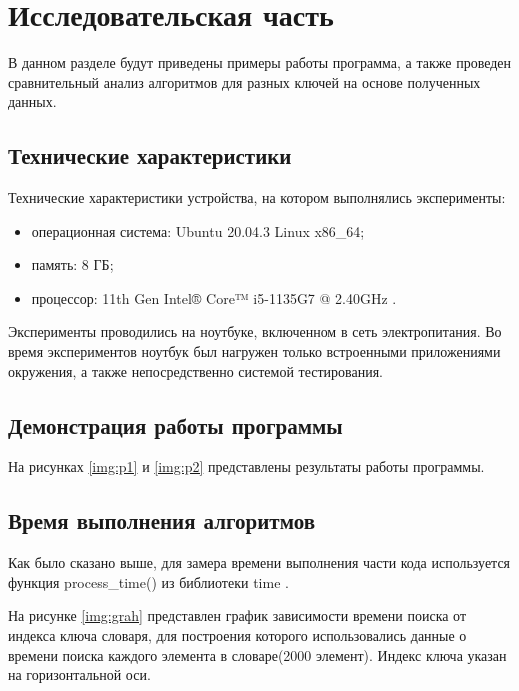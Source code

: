 \chapter{Исследовательская часть}
В данном разделе будут приведены примеры работы программа, а также
проведен сравнительный анализ алгоритмов для разных ключей на основе полученных данных.

\section{Технические характеристики}



Технические характеристики устройства, на котором выполнялись эксперименты:



\begin{itemize}

	
	\item операционная система: Ubuntu 20.04.3 \cite{ubuntu} Linux \cite{linux} x86\_64;

	
	\item память: 8 ГБ;

	
	\item процессор: 11th Gen Intel® Core™ i5-1135G7 @ 2.40GHz \cite{intel}.

	
\end{itemize}


Эксперименты проводились на ноутбуке, включенном в сеть электропитания. Во время экспериментов ноутбук был нагружен только встроенными приложениями окружения, а также непосредственно системой тестирования.


\section{Демонстрация работы программы}

На рисунках \ref{img:p1} и \ref{img:p2} представлены результаты работы программы.

\clearpage

\section{Время выполнения алгоритмов}
Как было сказано выше, для замера времени выполнения части кода используется функция process\_time() из библиотеки time \cite{pythonlangtime}. 

На рисунке \ref{img:grah} представлен график зависимости времени поиска от
индекса ключа словаря, для построения которого использовались данные
о времени поиска каждого элемента в словаре(2000 элемент). Индекс ключа
указан на горизонтальной оси.

